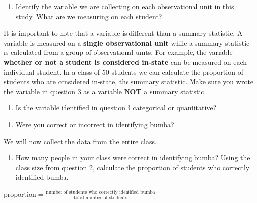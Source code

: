 \documentclass[
]{article}
\providecommand{\tightlist}{%
  \setlength{\itemsep}{0pt}\setlength{\parskip}{0pt}}
\begin{document}
\begin{enumerate}
\def\labelenumi{\arabic{enumi}.}
\setcounter{enumi}{2}
\tightlist
\item
  Identify the variable we are collecting on each observational unit in
  this study. What are we measuring on each student?
\end{enumerate}

\vspace{1in}

It is important to note that a variable is different than a summary
statistic. A variable is measured on a \textbf{single observational
unit} while a summary statistic is calculated from a group of
observational units. For example, the variable \textbf{whether or not a
student is considered in-state} can be measured on each individual
student. In a class of 50 students we can calculate the proportion of
students who are considered in-state, the summary statistic. Make sure
you wrote the variable in question 3 as a variable \textbf{NOT} a
summary statistic.

\begin{enumerate}
\def\labelenumi{\arabic{enumi}.}
\setcounter{enumi}{3}
\tightlist
\item
  Is the variable identified in question 3 categorical or quantitative?
\end{enumerate}

\vspace{0.5in}

\begin{enumerate}
\def\labelenumi{\arabic{enumi}.}
\setcounter{enumi}{4}
\tightlist
\item
  Were you correct or incorrect in identifying bumba?
\end{enumerate}

\vspace{0.5in}

We will now collect the data from the entire class.

\begin{enumerate}
\def\labelenumi{\arabic{enumi}.}
\setcounter{enumi}{5}
\tightlist
\item
  How many people in your class were correct in identifying bumba? Using
  the class size from question 2, calculate the proportion of students
  who correctly identified bumba.
\end{enumerate}

\begin{center}
$\mbox{proportion} = \frac{\mbox{number of students who correctly identified bumba}}{\mbox{total number of students}}$
\end{center}
\vspace{1in}
\end{document}
